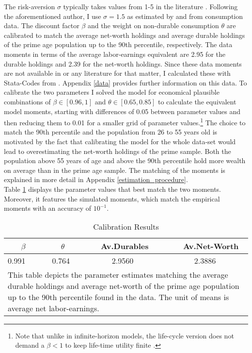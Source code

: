 \documentclass[a4paper,12pt,legno]{article}
\begin{document}
The risk-aversion $\sigma$ typically takes values from 1-5 in the literature \citep{yang2009}. Following the aforementioned author, I use $\sigma = 1.5$ as estimated by \cite{attanasio1999} and \cite{Gourinchas&Parker2002} from consumption data. The discount factor $\beta$ and the weight on non-durable consumption $\theta$ are calibrated to match the average net-worth holdings and average durable holdings of the prime age population up to the 90th percentile, respectively. The data moments in terms of the average labor-earnings equivalent are 2.95 for the durable holdings and 2.39 for the net-worth  holdings. Since these data moments are not available in \cite{hintermaier2011} or any literature for that matter, I calculated these with Stata-Codes from \cite{hintermaier2016}. Appendix \ref{data} provides further information on this data. To calibrate the two parameters I solved the model for economical plausible combinations of $\beta \in [0.96,1]$ and $\theta \in [0.65,0.85]$ to calculate the equivalent model moments, starting with differences of 0.05 between parameter values and then reducing them to 0.01 for a smaller grid of parameter values.\footnote{Note that unlike in infinite-horizon models, the life-cycle version does not demand a $\beta < 1$ to keep life-time utility finite \cite[p. 360]{heer2004dge}.} The choice to match the 90th percentile and the population from 26 to 55 years old is motivated by the fact that calibrating the model for the whole data-set would lead to overestimating the net-worth holdings of the prime sample. Both the population
above 55 years of age and above the 90th percentile hold more wealth on average than
in the prime age sample. The matching of the moments is explained in more detail in Appendix \ref{estimation_procedure}. \\
Table \ref{estimates} displays the parameter values that best match the two moments. Moreover, it features the simulated moments, which match the empirical moments with an accuracy of $10^{-1}$.

\begin{table}[!htbp]
\centering
\caption{Calibration Results}
\label{estimates}
\begin{tabular}{@{}llll@{}}
\toprule
\ \ \ $\beta$ & \ \ $\theta$ & \ Av.Durables & \ Av.Net-Worth \\ \midrule
0.991 \ \ \ \   & 0.764 \ \ \ \ & \ \ \ \ 2.9560 & \ \ \ \ 2.3886  \\ \bottomrule
\multicolumn{4}{l}{%
  \begin{minipage}{9.5cm}%
    \small This table depicts the parameter estimates matching the average durable holdings and average net-worth of the prime age population up to the 90th percentile found in the data. The unit of means is average net labor-earnings.   
  \end{minipage}%
}\\
\end{tabular}
\end{table}
\end{document}
